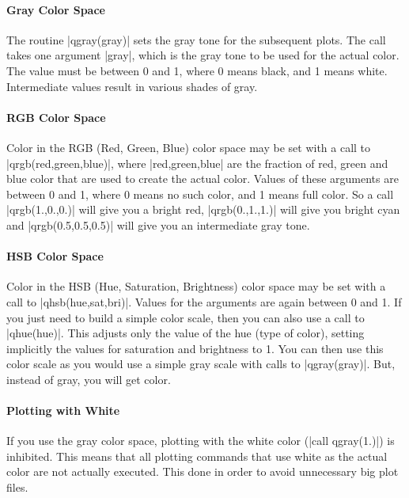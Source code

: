 \documentclass{article}
\begin{document}
\paragraph{Gray Color Space}

The routine |qgray(gray)| sets the gray tone for the subsequent plots.
The call takes one argument |gray|, which is the gray tone to be used
for the actual color. The value must be between 0 and 1, where 0 means
black, and 1 means white. Intermediate values result in various shades
of gray.

\paragraph{RGB Color Space}

Color in the RGB (Red, Green, Blue) color space may be set with a call
to |qrgb(red,green,blue)|, where |red,green,blue| are the fraction of red,
green and blue color that are used to create the actual color.  Values
of these arguments are between 0 and 1, where 0 means no such color,
and 1 means full color. So a call |qrgb(1.,0.,0.)| will give you a
bright red, |qrgb(0.,1.,1.)| will give you bright cyan and
|qrgb(0.5,0.5,0.5)| will give you an intermediate gray tone.

\paragraph{HSB Color Space}

Color in the HSB (Hue, Saturation, Brightness) color space may be set
with a call to |qhsb(hue,sat,bri)|. Values for the arguments are again
between 0 and 1. If you just need to build a simple color scale, then
you can also use a call to |qhue(hue)|. This adjusts only the value of
the hue (type of color), setting implicitly the values for saturation
and brightness to 1. You can then use this color scale as you would use
a simple gray scale with calls to |qgray(gray)|. But, instead of gray,
you will get color.

\paragraph{Plotting with White}

If you use the gray color space, plotting with the white color 
(|call qgray(1.)|) is inhibited. This means that all plotting commands that
use white as the actual color are not actually executed. This done in
order to avoid unnecessary big plot files.
\end{document}
